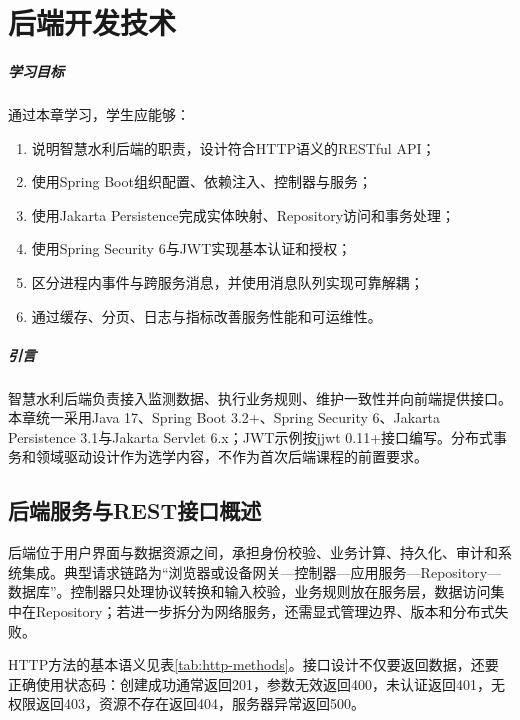 \chapter{后端开发技术}

\paragraph*{学习目标}

通过本章学习，学生应能够：
\begin{enumerate}
\item 说明智慧水利后端的职责，设计符合HTTP语义的RESTful API；
\item 使用Spring Boot组织配置、依赖注入、控制器与服务；
\item 使用Jakarta Persistence完成实体映射、Repository访问和事务处理；
\item 使用Spring Security 6与JWT实现基本认证和授权；
\item 区分进程内事件与跨服务消息，并使用消息队列实现可靠解耦；
\item 通过缓存、分页、日志与指标改善服务性能和可运维性。
\end{enumerate}

\paragraph*{引言}

智慧水利后端负责接入监测数据、执行业务规则、维护一致性并向前端提供接口。本章统一采用Java 17、Spring Boot 3.2+、Spring Security 6、Jakarta Persistence 3.1与Jakarta Servlet 6.x；JWT示例按jjwt 0.11+接口编写。分布式事务和领域驱动设计作为选学内容，不作为首次后端课程的前置要求。

\section{后端服务与REST接口概述}

后端位于用户界面与数据资源之间，承担身份校验、业务计算、持久化、审计和系统集成。典型请求链路为“浏览器或设备网关—控制器—应用服务—Repository—数据库”。控制器只处理协议转换和输入校验，业务规则放在服务层，数据访问集中在Repository；若进一步拆分为网络服务，还需显式管理边界、版本和分布式失败\cite{newman2021}。

HTTP方法的基本语义见表\ref{tab:http-methods}。接口设计不仅要返回数据，还要正确使用状态码：创建成功通常返回201，参数无效返回400，未认证返回401，无权限返回403，资源不存在返回404，服务器异常返回500。


